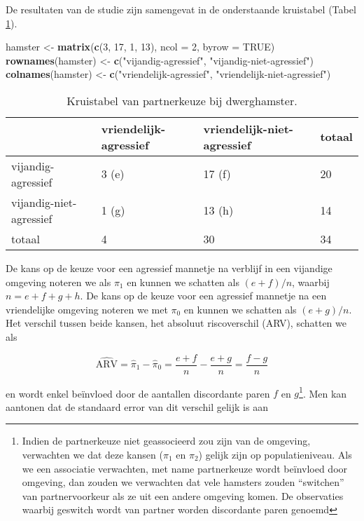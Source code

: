 \documentclass[
  12pt,dutch,coursenotes]{book}
\newenvironment{Shaded}{\begin{snugshade}}{\end{snugshade}}
\newcommand{\DataTypeTok}[1]{\textcolor[rgb]{0.13,0.29,0.53}{#1}}
\newcommand{\DecValTok}[1]{\textcolor[rgb]{0.00,0.00,0.81}{#1}}
\newcommand{\KeywordTok}[1]{\textcolor[rgb]{0.13,0.29,0.53}{\textbf{#1}}}
\newcommand{\NormalTok}[1]{#1}
\newcommand{\OtherTok}[1]{\textcolor[rgb]{0.56,0.35,0.01}{#1}}
\newcommand{\StringTok}[1]{\textcolor[rgb]{0.31,0.60,0.02}{#1}}
\theoremstyle{definition}
\theoremstyle{definition}
\theoremstyle{definition}
\theoremstyle{remark}
\begin{document}
De resultaten van de studie zijn samengevat in de onderstaande kruistabel (Tabel \ref{tab:catHamster}).

\begin{Shaded}
\begin{Highlighting}[]
\NormalTok{hamster \textless{}{-}}\StringTok{ }\KeywordTok{matrix}\NormalTok{(}\KeywordTok{c}\NormalTok{(}\DecValTok{3}\NormalTok{, }\DecValTok{17}\NormalTok{, }\DecValTok{1}\NormalTok{, }\DecValTok{13}\NormalTok{), }\DataTypeTok{ncol =} \DecValTok{2}\NormalTok{, }\DataTypeTok{byrow =} \OtherTok{TRUE}\NormalTok{)}
\KeywordTok{rownames}\NormalTok{(hamster) \textless{}{-}}\StringTok{ }\KeywordTok{c}\NormalTok{(}\StringTok{"vijandig{-}agressief"}\NormalTok{, }\StringTok{"vijandig{-}niet{-}agressief"}\NormalTok{)}
\KeywordTok{colnames}\NormalTok{(hamster) \textless{}{-}}\StringTok{ }\KeywordTok{c}\NormalTok{(}\StringTok{"vriendelijk{-}agressief"}\NormalTok{, }\StringTok{"vriendelijk{-}niet{-}agressief"}\NormalTok{)}
\end{Highlighting}
\end{Shaded}

\begin{table}

\caption{\label{tab:catHamster}Kruistabel van partnerkeuze bij dwerghamster.}
\centering
\begin{tabular}[t]{llll}
\toprule
  & vriendelijk-agressief & vriendelijk-niet-agressief & totaal\\
\midrule
vijandig-agressief & 3 (e) & 17 (f) & 20\\
vijandig-niet-agressief & 1 (g) & 13 (h) & 14\\
totaal & 4 & 30 & 34\\
\bottomrule
\end{tabular}
\end{table}

De kans op de keuze voor een agressief mannetje na verblijf in een vijandige omgeving noteren we als \(\pi_1\) en kunnen we schatten als \((e+f)/n\), waarbij \(n=e+f+g+h\). De kans op
de keuze voor een agressief mannetje na een vriendelijke omgeving noteren we met \(\pi_0\)
en kunnen we schatten als \((e+g)/n\). Het verschil tussen beide kansen,
het absoluut riscoverschil (ARV), schatten we als

\begin{equation*}
\widehat{\text{ARV}}=\hat\pi_1-\hat\pi_0=\frac{e+f}{n}-\frac{e+g}{n}=\frac{f-g}{n}
\end{equation*}

en wordt enkel beïnvloed door de aantallen discordante paren \(f\) en \(g\)\footnote{Indien de partnerkeuze niet geassocieerd zou zijn van de omgeving, verwachten we dat deze kansen (\(\pi_1\) en \(\pi_2\)) gelijk zijn op populatieniveau. Als we een associatie verwachten, met name partnerkeuze wordt beïnvloed door omgeving, dan zouden we verwachten dat vele hamsters zouden ``switchen'' van partnervoorkeur als ze uit een andere omgeving komen. De observaties waarbij geswitch wordt van partner worden discordante paren genoemd}. Men kan aantonen dat de standaard error van dit verschil gelijk is aan
\end{document}
